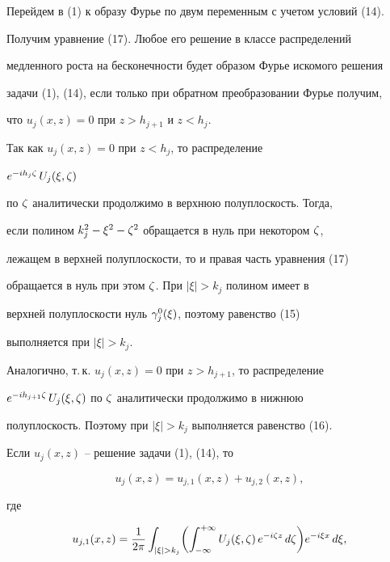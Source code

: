 \begin{pf}


Перейдем в (1) к образу Фурье по двум переменным с учетом условий (14).


Получим уравнение (17). Любое его решение в классе распределений


медленного роста на бесконечности будет образом Фурье искомого решения


задачи (1), (14), если только при обратном преобразовании Фурье получим,


что $u_j(x,z)=0$ при $z>h_{j+1}$ и $z<h_j$.





Так как $u_j(x,z)=0$ при $z<h_j$, то распределение


$e^{-ih_j\zeta}\,U_j(\xi,\zeta)$


по $\zeta$ аналитически продолжимо в верхнюю полуплоскость. Тогда,


если полином $k_j^2-\xi^2-\zeta^2$ обращается в нуль при некотором $\zeta$,


лежащем в верхней полуплоскости, то и правая часть уравнения (17)


обращается в нуль при этом $\zeta$. При $|\xi|>k_j$ полином имеет в


верхней полуплоскости нуль $\gamma_{j}^0(\xi)$, поэтому равенство (15)


выполняется при $|\xi|>k_j$.


Аналогично, т.\,к. $u_j(x,z)=0$ при $z>h_{j+1}$, то распределение


$e^{-ih_{j+1}\zeta}\,U_j(\xi,\zeta)$ по $\zeta$ аналитически продолжимо в нижнюю


полуплоскость. Поэтому при $|\xi|>k_j$ выполняется равенство (16).





Если $u_j(x,z)$ -- решение задачи (1), (14), то


$$


u_j(x,z) = u_{j,1}(x,z) + u_{j,2}(x,z) ,


$$


где


\begin{align*}


u_{j,1}(x,z) &=


\frac{1}{2\pi}\int_{|\xi|>k_j}


\biggl( \int_{-\infty}^{+\infty} U_j(\xi,\dz)\,e^{-i\dz z}\, d\dz


\biggr) e^{-i\xi x}\,d\xi,\\



\end{align*}
\end{pf}
